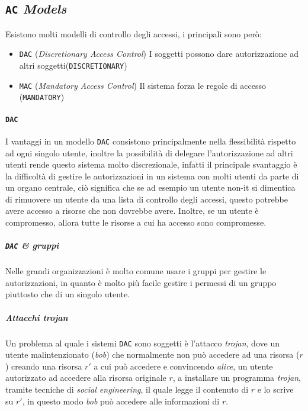     \subsection{\texttt{AC} \textit{Models}}
        Esistono molti modelli di controllo degli accessi, i principali sono però:
        \begin{itemize}
            \item \texttt{DAC} (\textit{Discretionary Access Control}) I soggetti possono dare autorizzazione ad altri soggetti\newline (\texttt{DISCRETIONARY})
            \item \texttt{MAC} (\textit{Mandatory Access Control}) Il sistema forza le regole di accesso (\texttt{MANDATORY})
        \end{itemize}
        \paragraph{\texttt{DAC}} I vantaggi in un modello \texttt{DAC} consistono principalmente nella flessibilità rispetto ad ogni singolo utente, inoltre la possibilità di delegare l'autorizzazione ad altri utenti rende questo sistema molto discrezionale, infatti il principale svantaggio è la difficoltà di gestire le autorizzazioni in un sistema con molti utenti da parte di un organo centrale, ciò significa che se ad esempio un utente non-it si dimentica di rimuovere un utente da una lista di controllo degli accessi, questo potrebbe avere accesso a risorse che non dovrebbe avere. Inoltre, se un utente è compromesso, allora tutte le risorse a cui ha accesso sono compromesse.
            \subparagraph{\texttt{DAC} \& gruppi} Nelle grandi organizzazioni è molto comune usare i gruppi per gestire le autorizzazioni, in quanto è molto più facile gestire i permessi di un gruppo piuttosto che di un singolo utente.
            \subparagraph{Attacchi \textit{trojan}} Un problema al quale i sistemi \texttt{DAC} sono soggetti è l'attacco \textit{trojan}, dove un utente malintenzionato (\textit{bob}) che normalmente non può accedere ad una risorsa ($r$) creando una risorsa $r'$ a cui può accedere e convincendo \textit{alice}, un utente autorizzato ad accedere alla risorsa originale $r$, a installare un programma \textit{trojan}, tramite tecniche di \textit{social engineering}, il quale legge il contenuto di $r$ e lo scrive su $r'$, in questo modo \textit{bob} può accedere alle informazioni di $r$.
